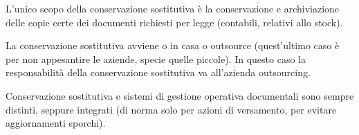 L'unico scopo della conservazione sostitutiva \`e la conservazione e
archiviazione delle copie certe dei documenti richiesti per legge
(contabili, relativi allo stock).

La conservazione sostitutiva avviene o in casa o outsource (quest'ultimo caso 
\`e per non appesantire le aziende, specie quelle piccole). 
In questo caso la responsabilit\`a della conservazione sostitutiva va 
all'azienda outsourcing.

Conservazione sostitutiva e sistemi di gestione operativa documentali
sono sempre distinti, seppure integrati (di norma solo per azioni di
versamento, per evitare aggiornamenti sporchi).
